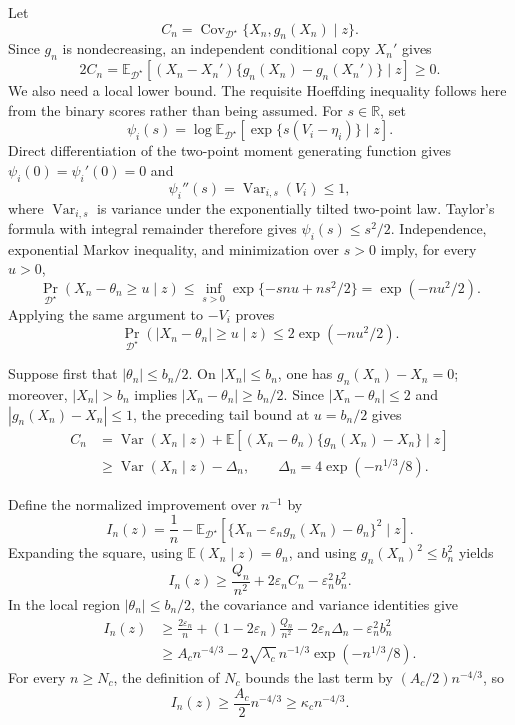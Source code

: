 Let
\[
 C_n=\operatorname{Cov}_{\mathcal D^\star}\{X_n,g_n(X_n)\mid z\}.
\]
Since \(g_n\) is nondecreasing, an independent conditional copy \(X_n'\) gives
\[
 2C_n=
 \mathbb E_{\mathcal D^\star}\left[
 (X_n-X_n')\{g_n(X_n)-g_n(X_n')\}\mid z
 \right]\geq0.
\]
We also need a local lower bound. The requisite Hoeffding inequality follows here from the binary scores rather than being assumed. For \(s\in\mathbb R\), set
\[
 \psi_i(s)=\log\mathbb E_{\mathcal D^\star}
 \left[\exp\{s(V_i-\eta_i)\}\mid z\right].
\]
Direct differentiation of the two-point moment generating function gives \(\psi_i(0)=\psi_i'(0)=0\) and
\[
 \psi_i''(s)=\operatorname{Var}_{i,s}(V_i)\leq1,
\]
where \(\operatorname{Var}_{i,s}\) is variance under the exponentially tilted two-point law. Taylor's formula with integral remainder therefore gives \(\psi_i(s)\leq s^2/2\). Independence, exponential Markov inequality, and minimization over \(s>0\) imply, for every \(u>0\),
\[
 \Pr_{\mathcal D^\star}(X_n-\theta_n\geq u\mid z)
 \leq\inf_{s>0}\exp\{-snu+ns^2/2\}
 =\exp(-nu^2/2).
\]
Applying the same argument to \(-V_i\) proves
\[
 \Pr_{\mathcal D^\star}(|X_n-\theta_n|\geq u\mid z)
 \leq2\exp(-nu^2/2).
\]

Suppose first that \(|\theta_n|\leq b_n/2\). On \(|X_n|\leq b_n\), one has \(g_n(X_n)-X_n=0\); moreover, \(|X_n|>b_n\) implies \(|X_n-\theta_n|\geq b_n/2\). Since \(|X_n-\theta_n|\leq2\) and \(|g_n(X_n)-X_n|\leq1\), the preceding tail bound at \(u=b_n/2\) gives
\[
 \begin{aligned}
 C_n
 &=\operatorname{Var}(X_n\mid z)
 +\mathbb E[(X_n-\theta_n)\{g_n(X_n)-X_n\}\mid z]\\
 &\geq\operatorname{Var}(X_n\mid z)-\Delta_n,
 \qquad
 \Delta_n=4\exp(-n^{1/3}/8).
 \end{aligned}
\]

Define the normalized improvement over \(n^{-1}\) by
\[
 I_n(z)=\frac1n-
 \mathbb E_{\mathcal D^\star}
 \left[\{X_n-\varepsilon_ng_n(X_n)-\theta_n\}^2\mid z\right].
\]
Expanding the square, using \(\mathbb E(X_n\mid z)=\theta_n\), and using \(g_n(X_n)^2\leq b_n^2\) yields
\[
 I_n(z)\geq\frac{Q_n}{n^2}+2\varepsilon_nC_n-
 \varepsilon_n^2b_n^2.
\]
In the local region \(|\theta_n|\leq b_n/2\), the covariance and variance identities give
\[
 \begin{aligned}
 I_n(z)
 &\geq \frac{2\varepsilon_n}{n}
 +(1-2\varepsilon_n)\frac{Q_n}{n^2}
 -2\varepsilon_n\Delta_n-\varepsilon_n^2b_n^2\\
 &\geq A_cn^{-4/3}
 -2\sqrt{\lambda_c}\,n^{-1/3}\exp(-n^{1/3}/8).
 \end{aligned}
\]
For every \(n\geq N_c\), the definition of \(N_c\) bounds the last term by \((A_c/2)n^{-4/3}\), so
\[
 I_n(z)\geq\frac{A_c}{2}n^{-4/3}
 \geq\kappa_cn^{-4/3}.
\]

